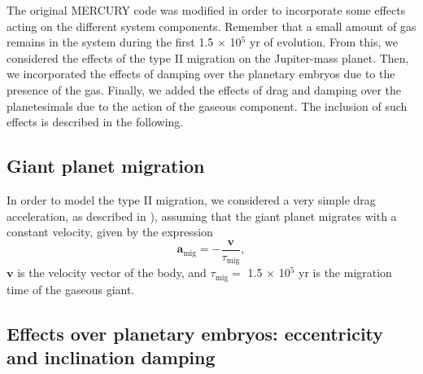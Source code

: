 \documentclass{aa}
\begin{document}
The original MERCURY code was modified in order to incorporate some effects acting on the different system components. Remember that a
small amount of gas remains in the system during the first 1.5 $\times$ 10$^{5}$ yr of evolution. From this, we considered the effects of
the type II migration on the Jupiter-mass planet. Then, we incorporated the effects of damping over the planetary embryos due to the
presence of the gas. Finally, we added the effects of drag and damping over the planetesimals due to the action of the gaseous component.
The inclusion of such effects is described in the following.

\subsection{Giant planet migration}
\label{section_nbody_migration}

In order to model the type II migration, we considered a very simple drag acceleration, as described in \citet{Chiang2002}),
assuming that the giant planet migrates with a constant velocity, given by the expression
\begin{equation}
 \mathbf{a}_{\text{mig}} = -\frac{\mathbf{v}}{\tau_{\text{mig}}},
\end{equation}
 $\mathbf{v}$ is the velocity vector of the body, and $\tau_{\text{mig}} = $ 1.5 $\times$ 10$^{5}$ yr is the migration time
of the gaseous giant.

\subsection{Effects over planetary embryos: eccentricity and inclination damping}
\label{section_nbody_effects_over_embryos}
\end{document}
